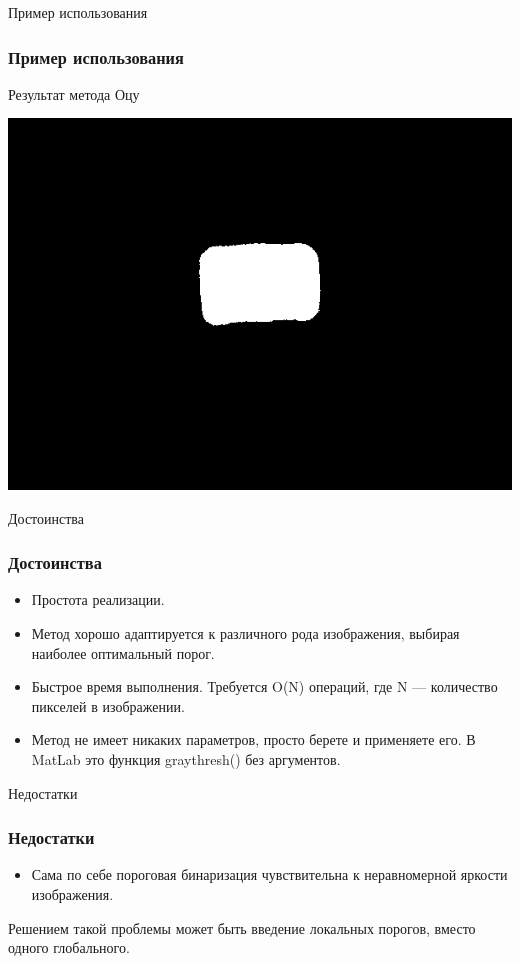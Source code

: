 \documentclass{beamer}
\begin{document}
\begin{frame}{Пример использования}
\frametitle{Пример использования}
Результат метода Оцу
 \begin{center}
  \includegraphics[width= 0.8\linewidth]{images/33.png}  
 \end{center}
\end{frame}


\begin{frame}{Достоинства}
\frametitle{Достоинства}
	\begin{itemize}
		\item Простота реализации.
 		\item Метод хорошо адаптируется к различного рода изображения, выбирая наиболее оптимальный порог.
  		\item Быстрое время выполнения. Требуется O(N) операций, где N — количество пикселей в изображении.
  		\item Метод не имеет никаких параметров, просто берете и применяете его. В MatLab это функция graythresh() без аргументов.
	\end{itemize}
\end{frame}

\begin{frame}{Недостатки}
\frametitle{Недостатки}
	\begin{itemize}
		\item Сама по себе пороговая бинаризация чувствительна к неравномерной яркости изображения.
	\end{itemize}
	
	Решением такой проблемы может быть введение локальных порогов, вместо одного глобального.
\end{frame}
\end{document}

